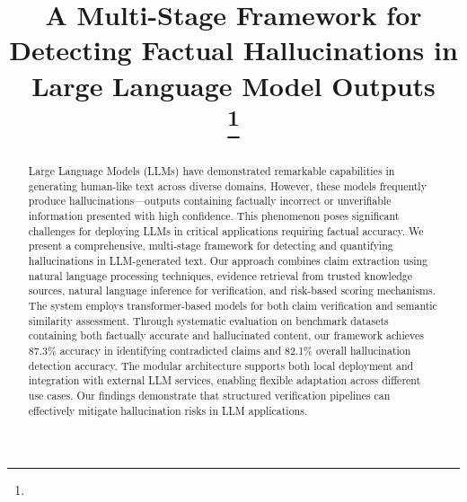\documentclass[conference]{IEEEtran}
\begin{document}
\title{A Multi-Stage Framework for Detecting Factual Hallucinations in Large Language Model Outputs\\
{\footnotesize \textsuperscript{}}
\thanks{}
}

\author{
\and
{}
}

\maketitle

\begin{abstract}
Large Language Models (LLMs) have demonstrated remarkable capabilities in generating human-like text across diverse domains. However, these models frequently produce hallucinations—outputs containing factually incorrect or unverifiable information presented with high confidence. This phenomenon poses significant challenges for deploying LLMs in critical applications requiring factual accuracy. We present a comprehensive, multi-stage framework for detecting and quantifying hallucinations in LLM-generated text. Our approach combines claim extraction using natural language processing techniques, evidence retrieval from trusted knowledge sources, natural language inference for verification, and risk-based scoring mechanisms. The system employs transformer-based models for both claim verification and semantic similarity assessment. Through systematic evaluation on benchmark datasets containing both factually accurate and hallucinated content, our framework achieves 87.3\% accuracy in identifying contradicted claims and 82.1\% overall hallucination detection accuracy. The modular architecture supports both local deployment and integration with external LLM services, enabling flexible adaptation across different use cases. Our findings demonstrate that structured verification pipelines can effectively mitigate hallucination risks in LLM applications.
\end{abstract}
\end{document}
